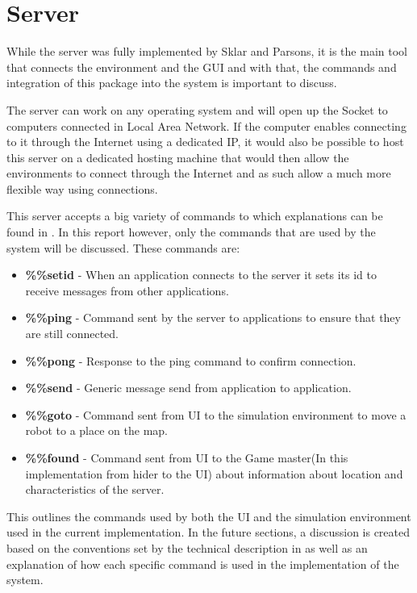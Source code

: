 \documentclass{report}
\begin{document}
    \section{Server}
      While the server was fully implemented by  Sklar and Parsons\cite{technical}, it is the main tool that connects the environment and the GUI and with that, the commands and integration of this package into the system is important to discuss.

      The server can work on any operating system and will open up the Socket to computers connected in Local Area Network. If the computer enables connecting to it through the Internet using a dedicated IP, it would also be possible to host this server on a dedicated hosting machine that would then allow the environments to connect through the Internet and as such allow a much more flexible way using connections.

      This server accepts a big variety of commands to which explanations can be found in \cite{technical}. In this report however, only the commands that are used by the system will be discussed. These commands are:

        \begin{itemize}
          \item \textbf{\%\%setid} - When an application connects to the server it sets its id to receive messages from other applications.
          \item \textbf{\%\%ping} - Command sent by the server to applications to ensure that they are still connected.
          \item \textbf{\%\%pong} - Response to the ping command to confirm connection.
          \item \textbf{\%\%send} - Generic message send from application to application.
          \item \textbf{\%\%goto} - Command sent from UI to the simulation environment to move a robot to a place on the map.
          \item \textbf{\%\%found} - Command sent from UI to the Game master(In this implementation from hider to the UI) about information about location and characteristics of the server.
        \end{itemize}

      This outlines the commands used by both the UI and the simulation environment used in the current implementation. In the future sections, a discussion is created based on the conventions set by the technical description in \cite{technical} as well as an explanation of how each specific command is used in the implementation of the system.
\end{document}
